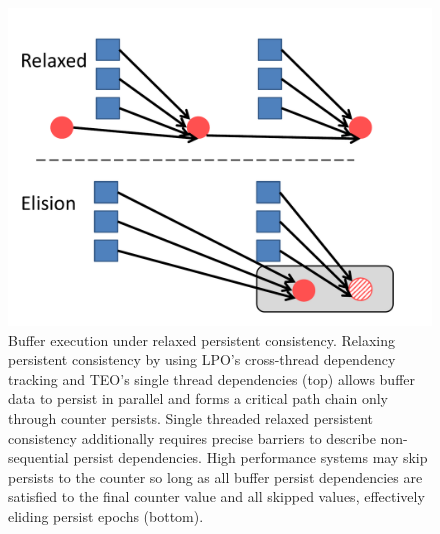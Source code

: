 \begin{figure}
\centering
\includegraphics[width=\textwidth]{PMC_patterns/buffer_relaxed_elision.pdf}
\caption{Buffer execution under relaxed persistent consistency.  Relaxing persistent consistency by using LPO's cross-thread dependency tracking and TEO's single thread dependencies (top) allows buffer data to persist in parallel and forms a critical path chain only through counter persists.  Single threaded relaxed persistent consistency additionally requires precise barriers to describe non-sequential persist dependencies.  High performance systems may skip persists to the counter so long as all buffer persist dependencies are satisfied to the final counter value and all skipped values, effectively eliding persist epochs (bottom).}
\label{figure::buffer_relaxed_elision}
\end{figure}
